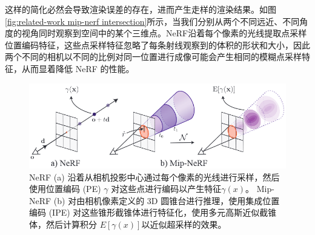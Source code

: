 这样的简化必然会导致渲染误差的存在，进而产生走样的渲染结果。如图\ref{fig:related-work mip-nerf intersection}所示，当我们分别从两个不同远近、不同角度的视角同时观察到空间中的某个三维点。NeRF沿着每个像素的光线提取点采样位置编码特征，这些点采样特征忽略了每条射线观察到的体积的形状和大小，因此两个不同的相机以不同的比例对同一位置进行成像可能会产生相同的模糊点采样特征，从而显着降低 NeRF 的性能。

\begin{figure}[h]
    \centering
    \includegraphics[width=\textwidth]{undergraduate-thesis/images/related-work/mipnerf-cone.png}
    \caption{NeRF (a) 沿着从相机投影中心通过每个像素的光线进行采样，然后使用位置编码 (PE) $\gamma$ 对这些点进行编码以产生特征$\gamma(x)$。 Mip-NeRF (b) 对由相机像素定义的 3D 圆锥台进行推理，使用集成位置编码 (IPE) 对这些锥形截锥体进行特征化，使用多元高斯近似截锥体，然后计算积分 $E[\gamma(x)]$以近似超采样的效果\cite{barron_mip-nerf_2021}。}
    \label{fig:related-work mip-nerf cone tracing}
\end{figure}

